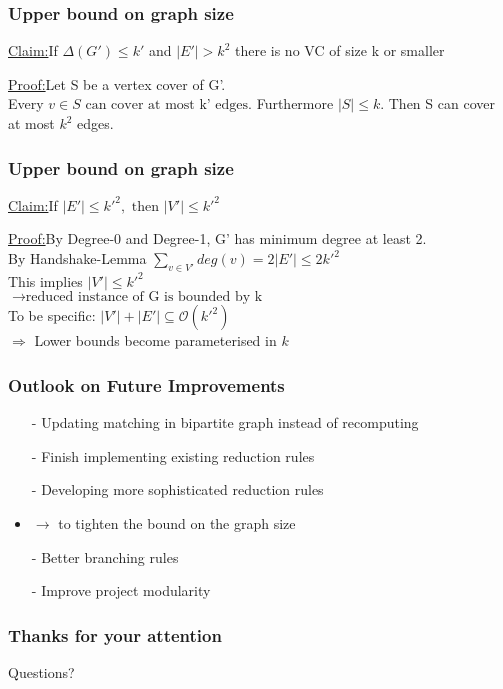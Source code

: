 \documentclass{beamer}[12pt]
\newenvironment{claim}[1]{\par\noindent\underline{Claim:}\newline#1}{}
\renewenvironment{proof}[1]{\par\noindent\underline{Proof:}\newline#1}{}
\begin{document}
	\begin{frame}
		\frametitle{Upper bound on graph size}
		
		\begin{claim}
			If $\Delta(G') \leq k'$ and $|E'| > k^2$ there is no VC of size k or smaller
		\end{claim}
		\pause
		\begin{proof}
			Let S be a vertex cover of G'. \\
			Every $v \in S \text{ can cover at most k' edges}.$
			Furthermore $|S| \leq k$. Then S can cover at most $k^2$ edges.
		\end{proof}
	\end{frame}
	
	\begin{frame}
	\frametitle{Upper bound on graph size}
		\begin{claim}
			If $|E'| \leq k'^2, \text{ then } |V'| \leq k'^2$
		\end{claim}
		\pause
		\begin{proof}
			By Degree-0 and Degree-1, G' has minimum degree at least 2. \\
			By Handshake-Lemma $\sum\nolimits_{v \in V'} deg(v) = 2|E'| \leq 2k'^2$\\
			This implies $|V'| \leq k'^2$
		\end{proof}
		\\
		\pause
		\vspace{5mm}
		$\rightarrow \text{reduced instance of G is bounded by k}$ \\
		\vspace{4mm}
		To be specific:
		$|V'| + |E'| \subseteq \mathcal{O}(k'^2)$\\
		$\Rightarrow$ Lower bounds become parameterised in $k$
	\end{frame}
	
	\begin{frame}
		\frametitle{Outlook on Future Improvements}
		
		\begin{itemize}
			\item[-] Updating matching in bipartite graph instead of recomputing
			\item[-] Finish implementing existing reduction rules
			\item[-] Developing more sophisticated reduction rules 
			\item 	$\rightarrow$ to tighten the bound on the graph size
			\item[-] Better branching rules
			\item[-] Improve project modularity
		\end{itemize}
		


		
	\end{frame}
	\begin{frame}
		\frametitle{Thanks for your attention}
		\centering	\Huge Questions?
	\end{frame}
\end{document}
